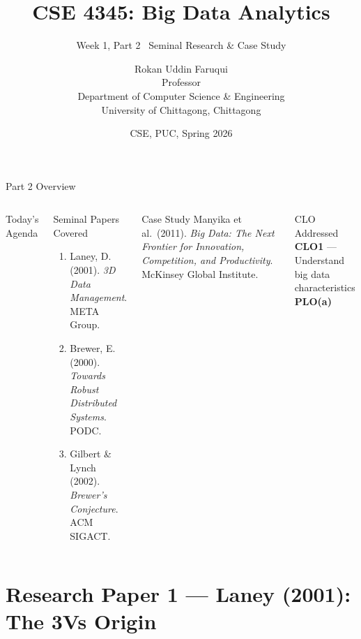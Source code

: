 \documentclass[aspectratio=169,10pt]{beamer}
\title[CSE 4345 \textbar{} Week 1, Part 2]{CSE 4345: Big Data Analytics}
\subtitle{Week 1, Part 2 \textemdash\ Seminal Research \& Case Study}
\author[Dept.\ of CSE]{{\sc Rokan Uddin Faruqui} \\ Professor \\ Department of Computer Science \& Engineering\\[4pt]
       \small University of Chittagong, Chittagong}
\institute{}
\date{CSE, PUC, Spring 2026}
\begin{document}

\begin{frame}
  \titlepage
\end{frame}

\begin{frame}{Part 2 Overview}
  \begin{columns}[T]
      \begin{block}{Today's Agenda}
        \tableofcontents
      \end{block}

      \begin{exampleblock}{Seminal Papers Covered}
        \begin{enumerate}
          \item Laney, D. (2001). \textit{3D Data Management}. META Group.
          \item Brewer, E. (2000). \textit{Towards Robust Distributed Systems}. PODC.
          \item Gilbert \& Lynch (2002). \textit{Brewer's Conjecture}. ACM SIGACT.
        \end{enumerate}
      \end{exampleblock}
      \vspace{6pt}
      \begin{alertblock}{Case Study}
        Manyika et al.\ (2011). \textit{Big Data: The Next Frontier for Innovation, Competition, and Productivity}. McKinsey Global Institute.
      \end{alertblock}
      \vspace{4pt}
      \begin{block}{CLO Addressed}
        \textbf{CLO1} — Understand big data characteristics\\
        \textbf{PLO(a)}
      \end{block}
  \end{columns}
\end{frame}

\section{Research Paper 1 — Laney (2001): The 3Vs Origin}
\end{document}

